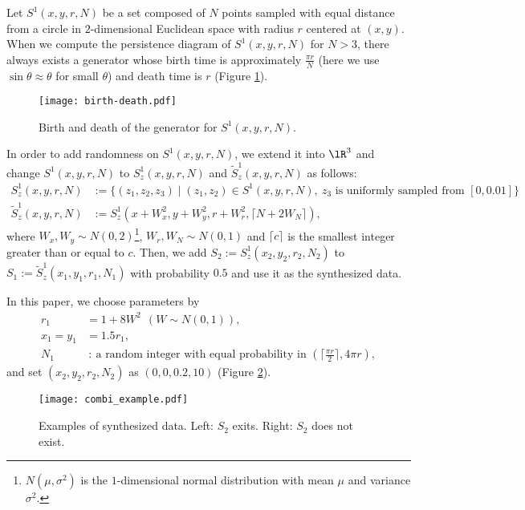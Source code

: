 \documentclass{article}
\begin{document}
Let $S^{1}(x,y,r,N)$
 be a set composed of $N$ points sampled with equal distance from a circle in $2$-dimensional Euclidean space with radius $r$ centered at $(x,y)$.
When we compute the persistence diagram of $S^{1}(x,y,r,N)$ for $N>3$, there always exists a generator whose birth time is approximately $\frac{\pi r}{N}$ (here we use $\sin \theta \approx \theta$ for small $\theta$) and death time is $r$ (Figure \ref{fig:birth-death}).
\begin{figure}[htbp]
\begin{center}
\texttt{[image: birth-death.pdf]}
\end{center}
\caption{Birth and death of the generator for $S^{1}(x,y,r,N)$.}
\label{fig:birth-death}
\end{figure}

In order to add randomness on $S^{1}(x,y,r,N)$, we extend it into $\lR^{3}$ and change $S^{1}(x,y,r,N)$ to $S_{z}^{1}(x,y,r,N)$ and $\tilde{S}_{z}^{1}(x,y,r,N)$ as follows:
\begin{align*}
S_{z}^{1}(x,y,r,N) &:=\{(z_{1},z_{2},z_{3}) \mid (z_{1},z_{2}) \in S^{1}(x,y,r,N), \ z_{3} \mbox{ is uniformly sampled from }[0, 0.01] \}\\
\tilde{S}_{z}^{1}(x,y,r,N) &:=S_{z}^{1}(x+W_{x}^{2},y+W_{y}^{2},r+W_{r}^{2}, \lceil N+2 W_{N} \rceil), 
\end{align*}
where $W_{x},W_{y} \sim N(0,2)$\footnote{$N(\mu,\sigma^{2})$ is the $1$-dimensional normal distribution with mean $\mu$ and variance $\sigma^{2}$.}, $W_{r},W_{N} \sim N(0,1)$ and $\lceil c \rceil$ is the smallest integer greater than or equal to $c$.
Then, we add $S_{2}:=S_{z}^{1}(x_{2},y_{2},r_{2},N_{2})$ to $S_{1}:=\tilde{S}_{z}^{1}(x_{1},y_{1},r_{1},N_{1})$ with probability $0.5$ and use it as the synthesized data.

In this paper, we choose parameters by
\begin{align*}
r_{1}&=1+8 W^{2} ~~ (W\sim N(0,1)), \\
x_{1}=y_{1}&=1.5 r_{1}, \\
N_{1}& ~:~ \mbox{a random integer with equal probability in } (\lceil \frac{\pi r}{2} \rceil, 4\pi r),
\end{align*}
and set $(x_{2},y_{2},r_{2},N_{2})$ as $(0,0,0.2,10)$ (Figure \ref{fig:synthesized}).
\begin{figure}[htbp]
\begin{center}
\texttt{[image: combi\_example.pdf]}
\end{center}
\caption{Examples of synthesized data.  Left: $S_2$ exits. Right: $S_2$ does not exist. }
\label{fig:synthesized}
\end{figure}
\end{document}
